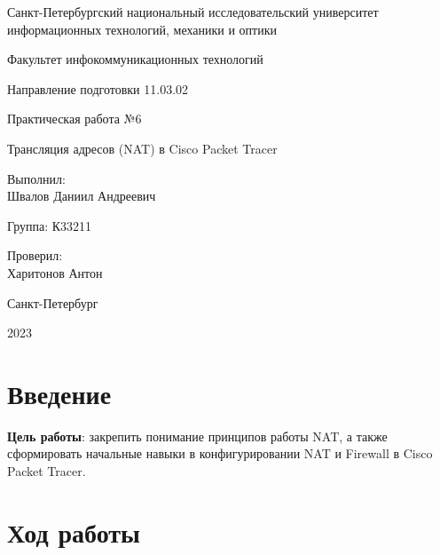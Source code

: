 \documentclass[a4paper, 14pt]{extarticle}
\begin{document}
\begin{titlepage}
  \vspace{0pt plus2fill}
  \noindent

  \vspace{0pt plus6fill}
  \begin{center}
    Санкт-Петербургский национальный исследовательский университет
    информационных технологий, механики и оптики

    \vspace{0pt plus2fill}

    Факультет инфокоммуникационных технологий

    Направление подготовки 11.03.02

    \vspace{0pt plus2fill}

    Практическая работа №6

    \vspace{0pt plus1fill}

    Трансляция адресов (NAT) в Cisco Packet Tracer

  \end{center}

  \vspace{0pt plus7fill}
  \begin{flushright}
    Выполнил: \\
    Швалов Даниил Андреевич

    Группа: К33211

    Проверил: \\
    Харитонов Антон
  \end{flushright}

  \vspace{0pt plus2fill}
  \begin{center}
    Санкт-Петербург

    2023
  \end{center}
\end{titlepage}

\setcounter{page}{2}

\section{Введение}

\textbf{Цель работы}: закрепить понимание принципов работы NAT, а также
сформировать начальные навыки в конфигурировании NAT и Firewall в Cisco Packet
Tracer.

\section{Ход работы}
\end{document}
